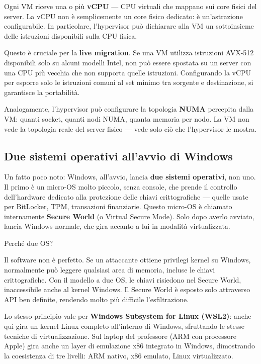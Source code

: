 \documentclass[
  italian,
  openany]{book}
\begin{document}
Ogni VM riceve una o più \textbf{vCPU} --- CPU virtuali che mappano sui
core fisici del server. La vCPU non è semplicemente un core fisico
dedicato: è un'astrazione configurabile. In particolare, l'hypervisor
può dichiarare alla VM un sottoinsieme delle istruzioni disponibili
sulla CPU fisica.

Questo è cruciale per la \textbf{live migration}. Se una VM utilizza
istruzioni AVX-512 disponibili solo su alcuni modelli Intel, non può
essere spostata su un server con una CPU più vecchia che non supporta
quelle istruzioni. Configurando la vCPU per esporre solo le istruzioni
comuni al set minimo tra sorgente e destinazione, si garantisce la
portabilità.

Analogamente, l'hypervisor può configurare la topologia \textbf{NUMA}
percepita dalla VM: quanti socket, quanti nodi NUMA, quanta memoria per
nodo. La VM non vede la topologia reale del server fisico --- vede solo
ciò che l'hypervisor le mostra.

\subsection{Due sistemi operativi all'avvio di
Windows}\label{due-sistemi-operativi-allavvio-di-windows}

Un fatto poco noto: Windows, all'avvio, lancia \textbf{due sistemi
operativi}, non uno. Il primo è un micro-OS molto piccolo, senza
console, che prende il controllo dell'hardware dedicato alla protezione
delle chiavi crittografiche --- quelle usate per BitLocker, TPM,
transazioni finanziarie. Questo micro-OS è chiamato internamente
\textbf{Secure World} (o Virtual Secure Mode). Solo dopo averlo avviato,
lancia Windows normale, che gira accanto a lui in modalità
virtualizzata.

\begin{callouttip}{Perché due OS?}

Il software non è perfetto. Se un attaccante ottiene privilegi kernel su
Windows, normalmente può leggere qualsiasi area di memoria, incluse le
chiavi crittografiche. Con il modello a due OS, le chiavi risiedono nel
Secure World, inaccessibile anche al kernel Windows. Il Secure World è
esposto solo attraverso API ben definite, rendendo molto più difficile
l'esfiltrazione.

\end{callouttip}

Lo stesso principio vale per \textbf{Windows Subsystem for Linux
(WSL2)}: anche qui gira un kernel Linux completo all'interno di Windows,
sfruttando le stesse tecniche di virtualizzazione. Sul laptop del
professore (ARM con processore Apple) gira anche un layer di emulazione
x86 integrato in Windows, dimostrando la coesistenza di tre livelli: ARM
nativo, x86 emulato, Linux virtualizzato.
\end{document}
